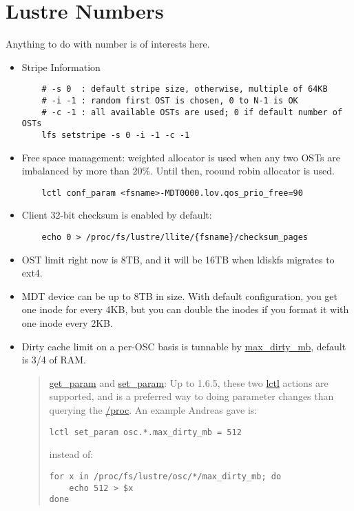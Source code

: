 \section{Lustre Numbers}

Anything to do with number is of interests here.


\begin{itemize}

\item Stripe Information

\begin{Verbatim}
    # -s 0  : default stripe size, otherwise, multiple of 64KB
    # -i -1 : random first OST is chosen, 0 to N-1 is OK
    # -c -1 : all available OSTs are used; 0 if default number of OSTs  
    lfs setstripe -s 0 -i -1 -c -1
\end{Verbatim}

\item Free space management: weighted allocator is used when any two OSTs are
imbalanced by more than 20\%. Until then, roound robin allocator is used.

\begin{Verbatim}
    lctl conf_param <fsname>-MDT0000.lov.qos_prio_free=90
\end{Verbatim}


\item Client 32-bit checksum is enabled by default:

\begin{Verbatim}
    echo 0 > /proc/fs/lustre/llite/{fsname}/checksum_pages
\end{Verbatim}


\item OST limit right now is 8TB, and it will be 16TB when ldiskfs migrates to
ext4. 

\item MDT device can be up to 8TB in size. With default configuration, you get
one inode for every 4KB, but you can double the inodes if you format it with
one inode every 2KB.

\item Dirty cache limit on a per-OSC basis is tunnable by \url{max_dirty_mb},
default is 3/4 of RAM.

\begin{quote}

\url{get_param} and \url{set_param}: Up to 1.6.5, these two \url{lctl} actions
are supported, and is a preferred way to doing parameter changes than querying
the \url{/proc}. An example Andreas gave is:
\smallskip
\begin{Verbatim}
lctl set_param osc.*.max_dirty_mb = 512
\end{Verbatim}
\smallskip
instead of:
\smallskip
\begin{Verbatim}
for x in /proc/fs/lustre/osc/*/max_dirty_mb; do
    echo 512 > $x
done
\end{Verbatim}


\end{quote}
\end{itemize}
